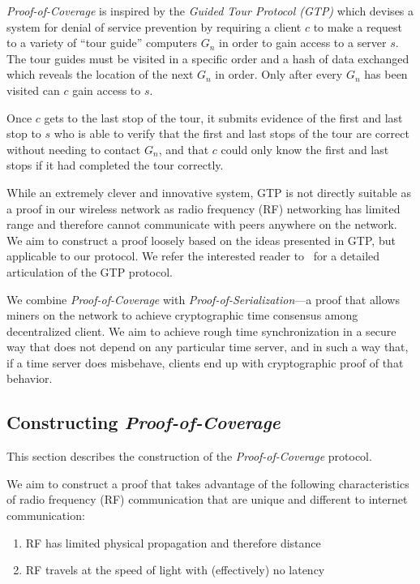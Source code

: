 \documentclass[letterpaper,11pt]{article}
\begin{document}
\emph{Proof-of-Coverage} is inspired by the \emph{Guided Tour Protocol (GTP)} which devises a system for denial of service prevention by requiring a client $c$ to make a request to a variety of ``tour guide'' computers $G_n$ in order to gain access to a server $s$. The tour guides must be visited in a specific order and a hash of data exchanged which reveals the location of the next $G_n$ in order. Only after every $G_n$ has been visited can $c$ gain access to $s$.

Once $c$ gets to the last stop of the tour, it submits evidence of the first and last stop to $s$ who is able to verify that the first and last stops of the tour are correct without needing to contact $G_n$, and that $c$ could only know the first and last stops if it had completed the tour correctly.

While an extremely clever and innovative system, GTP is not directly suitable as a proof in our wireless network as radio frequency (RF) networking has limited range and therefore cannot communicate with peers anywhere on the network. We aim to construct a proof loosely based on the ideas presented in GTP, but applicable to our protocol. We refer the interested reader to~\cite{gtp} for a detailed articulation of the GTP protocol.

We combine \emph{Proof-of-Coverage} with \emph{Proof-of-Serialization}---a proof that allows miners on the network to achieve cryptographic time consensus among decentralized client. We aim to achieve rough time synchronization in a secure way that does not depend on any particular time server, and in such a way that, if a time server does misbehave, clients end up with cryptographic proof of that behavior.

\subsection{Constructing \emph{Proof-of-Coverage}}

This section describes the construction of the \emph{Proof-of-Coverage} protocol.

We aim to construct a proof that takes advantage of the following characteristics of radio frequency (RF) communication that are unique and different to internet communication:

\begin{enumerate}
    \item RF has limited physical propagation and therefore distance
    \item RF travels at the speed of light with (effectively) no latency
\end{enumerate}
\end{document}
